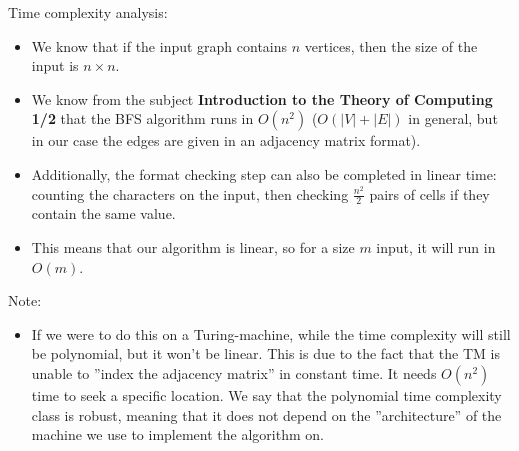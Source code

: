 Time complexity analysis:
\begin{itemize}
    \item We know that if the input graph contains $n$ vertices, then the size of the input is $n\times{}n$.
    \item We know from the subject \textbf{Introduction to the Theory of Computing 1/2} that the BFS algorithm runs in $O(n^2)$ ($O(|V| + |E|)$ in general, but in our case the edges are given in an adjacency matrix format).
    \item Additionally, the format checking step can also be completed in linear time: counting the characters on the input, then checking $\frac{n^2}{2}$ pairs of cells if they contain the same value.
    \item This means that our algorithm is linear, so for a size $m$ input, it will run in $O(m)$.
\end{itemize}

Note:
\begin{itemize}
    \item If we were to do this on a Turing-machine, while the time complexity will still be polynomial, but it won't be linear. This is due to the fact that the TM is unable to ''index the adjacency matrix'' in constant time. It needs $O(n^2)$ time to seek a specific location. We say that the polynomial time complexity class is robust, meaning that it does not depend on the ''architecture'' of the machine we use to implement the algorithm on.
\end{itemize}